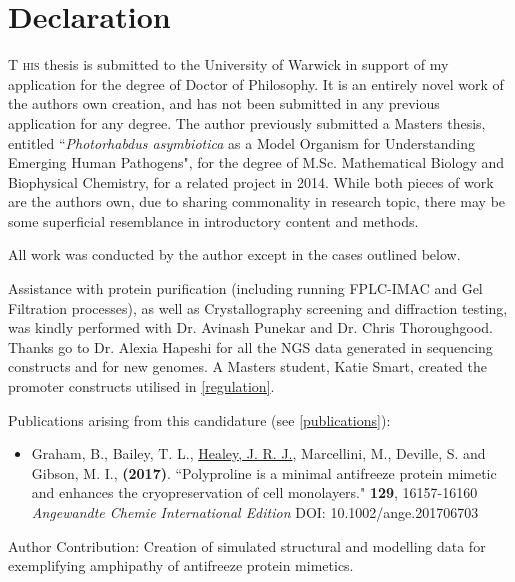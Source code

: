 \documentclass[a4paper, oneside, 11pt]{report} %
\begin{document}


\rhead{\textsf{}}
\chapter*{Declaration}

\lettrine[lraise=0.0, nindent=0.1em, slope=1em]{T}{ his} thesis is submitted to the University of Warwick in support of my application for the degree of Doctor of Philosophy. It is an entirely novel work of the authors own creation, and has not been submitted in any previous application for any degree. The author previously submitted a Masters thesis, entitled ``\emph{Photorhabdus asymbiotica} as a Model Organism for Understanding Emerging Human Pathogens", for the degree of M.Sc. Mathematical Biology and Biophysical Chemistry, for a related project in 2014. While both pieces of work are the authors own, due to sharing commonality in research topic, there may be some superficial resemblance in introductory content and methods.

All work was conducted by the author except in the cases outlined below.

Assistance with protein purification (including running FPLC-IMAC and Gel Filtration processes), as well as Crystallography screening and diffraction testing, was kindly performed with Dr. Avinash Punekar and Dr. Chris Thoroughgood. Thanks go to Dr. Alexia Hapeshi for all the NGS data generated in sequencing constructs and for new genomes. A Masters student, Katie Smart, created the promoter constructs utilised in \vref{regulation}.

Publications arising from this candidature (see \vref{publications}):

\begin{itemize}
\item Graham, B., Bailey, T. L., \underline{Healey, J. R. J.}, Marcellini, M., Deville, S. and Gibson, M. I., \textbf{(2017)}.
``Polyproline is a minimal antifreeze protein mimetic and enhances the cryopreservation of cell monolayers." \textbf{129}, 16157-16160 \emph{Angewandte Chemie International Edition} DOI: 10.1002/ange.201706703
\end{itemize}
Author Contribution: Creation of simulated structural and modelling data for exemplifying amphipathy of antifreeze protein mimetics.
\end{document}
